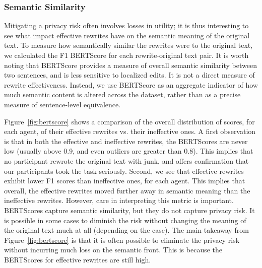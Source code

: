 \subsubsection{Semantic Similarity}
%

Mitigating a privacy risk often involves losses in utility; it is thus interesting to see what impact effective rewrites have on the semantic meaning of the original text. To measure how semantically similar the rewrites were to the original text, we calculated the F1 BERTScore for each rewrite-original text pair. It is worth noting that BERTScore provides a measure of overall semantic similarity between two sentences, and is less sensitive to localized edits. It is not a direct measure of rewrite effectiveness.
Instead, we use BERTScore as an aggregate indicator of how much semantic content is altered across the dataset, rather than as a precise measure of sentence-level equivalence.

Figure~\ref{fig:bertscore} shows a comparison of the overall distribution of scores, for each agent, of their effective rewrites vs. their ineffective ones. A first observation is that in both the effective and ineffective rewrites, the BERTScores are never low (usually above 0.9, and even outliers are greater than 0.8). This implies that no participant rewrote the original text with junk, and offers confirmation that our participants took the task seriously. Second, we see that effective rewrites exhibit lower F1 scores than ineffective ones, for each agent. This implies that overall, the effective rewrites moved further away in semantic meaning than the ineffective rewrites. However, care in interpreting this metric is important. BERTScores capture semantic similarity, but they do not capture privacy risk. It is possible in some cases to diminish the risk without changing the meaning of the original text much at all (depending on the case). The main takeaway from Figure~\ref{fig:bertscore} is that it is often possible to eliminate the privacy risk without incurring much loss on the semantic front. This is because the BERTScores for effective rewrites are still high. 

